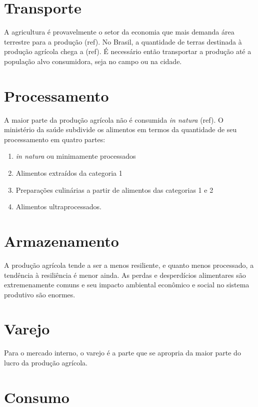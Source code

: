 \documentclass[]{article}
\begin{document}
\section{Transporte}

A agricultura é provavelmente o setor da economia que mais demanda área terrestre para a produção (ref). No Brasil, a quantidade de terras destinada à produção agrícola chega a (ref). É necessário então transportar a produção até a população alvo consumidora, seja no campo ou na cidade.  

\section{Processamento}

A maior parte da produção agrícola não é consumida \textit{in natura} (ref). O ministério da saúde subdivide os alimentos em termos da quantidade de seu processamento em quatro partes: 

\begin{enumerate}
	\item \textit{in natura} ou minimamente processados
	\item Alimentos extraídos da categoria 1
	\item Preparações culinárias a partir de alimentos das categorias 1 e 2
	\item Alimentos ultraprocessados.
\end{enumerate}


\section{Armazenamento}

A produção agrícola tende a ser a menos resiliente, e quanto menos processado, a tendência à resiliência é menor ainda. As perdas e desperdícios alimentares são extremenamente comuns e seu impacto ambiental econômico e social no sistema produtivo são enormes. 

\section{Varejo}

Para o mercado interno, o varejo é a parte que se apropria da maior parte do lucro da produção agrícola.

\section{Consumo}
\end{document}
